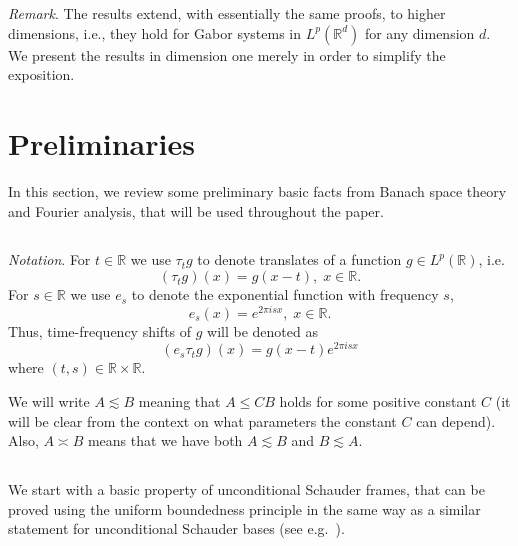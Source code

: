 \documentclass[reqno,a4paper,12pt]{amsart}
\numberwithin{equation}{section}
\numberwithin{figure}{section}
\newcommand\R{\mathbb{R}}
\newcommand\1{\mathds{1}}
\newcommand{\ts}{\tau}
\renewcommand\le{\leqslant}
\theoremstyle{plain}
\theoremstyle{definition}
\begin{document}
\emph{Remark}. The results extend, with essentially the same proofs, to higher dimensions,
i.e., they hold for Gabor systems in $L^p(\R^d)$ for any dimension $d$.
We present the results in dimension one merely in order to simplify the exposition.






\section{Preliminaries}
\label{sec:prelim}

In this section, we review some preliminary 
basic facts from Banach space theory and Fourier analysis, 
that will be used throughout the paper. 

\subsection{}
\emph{Notation}. 
For $t\in\R$ we use $\ts_t g$ to denote translates of a function $g\in L^p(\R)$, i.e. 
\begin{equation}
(\ts_t g)(x)=g(x-t), \; x \in \R.
\end{equation}
For $s \in \R$ we use $e_s$ to denote the exponential function with frequency $s$,
\begin{equation}
e_s(x) = e^{2\pi i s x}, \;  x \in \R.
\end{equation}
Thus, time-frequency shifts of $g$ will be denoted as 
\begin{equation}
(e_s \ts_t g)(x) =  g(x-t) e^{2 \pi i s x} 
\end{equation}
where $(t,s) \in \R \times \R$.



We will write $A\lesssim B$ meaning that $A\le CB$ holds for some positive constant $C$ (it will   be clear from the context on what parameters the constant $C$ can depend). Also, $A\asymp B$ means that we have both $A\lesssim B$ and $B\lesssim A$.

\subsection{}
We start with a basic property of unconditional Schauder frames, that can be proved
using the uniform boundedness principle in the same way 
as a similar statement for unconditional Schauder bases (see e.g.\ \cite[Proposition 3.1.3]{AK16}).
\end{document}
